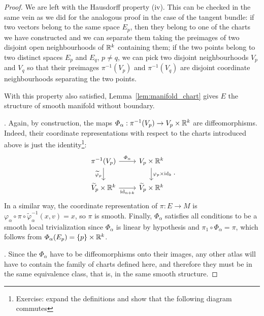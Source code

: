 \begin{proof}
	We are left with the Hausdorff property (iv).
	This can be checked in the same vein as we did for the analogous proof in the case of the tangent bundle:
	if two vectors belong to the same space $E_p$, then they belong to one of the charts we have constructed and we can separate them taking the preimages of two disjoint open neighbourhoods of $\mathbb{R}^k$ containing them; if the two points belong to two distinct spaces $E_p$ and $E_q$, $p\neq q$, we can pick two disjoint neighbourhoods $V_p$ and $V_q$ so that their preimages $\pi^{-1}(V_p)$ and $\pi^{-1}(V_q)$ are disjoint coordinate neighbourhoods separating the two points.

	With this property also satisfied, Lemma~\ref{lem:manifold_chart} gives $E$ the structure of smooth manifold without boundary.

	.
	Again, by construction, the maps $\varPhi_\alpha : \pi^{-1}(V_p) \to V_p\times\mathbb{R}^k$ are diffeomorphisms.
	Indeed, their coordinate representations with respect to the charts introduced above is just the identity\footnote{Exercise: expand the definitions and show that the following diagram commutes}:
	\begin{equation}
		\begin{tikzcd}
			{\pi^{-1}(V_p)} & {V_p\times\R^k} \\
			{\widetilde{V}_p\times\R^k} & {\widetilde{V}_p\times\R^k}
			\arrow["{\varPhi_\alpha}", from=1-1, to=1-2]
			\arrow["{\varphi_p\times\id_k}", from=1-2, to=2-2]
			\arrow["{\widetilde{\varphi}_p}"', from=1-1, to=2-1]
			\arrow["{\id_{n+k}}"', from=2-1, to=2-2]
		\end{tikzcd}.
	\end{equation}
	In a similar way, the coordinate representation of $\pi : E \to M$ is $\varphi_\alpha \circ \pi \circ \widetilde{\varphi}_\alpha^{-1} (x,v) = x$, so $\pi$ is smooth.
	Finally, $\Phi_\alpha$ satisfies all conditions to be a smooth local trivialization since $\varPhi_\alpha$ is linear by hypothesis and $\pi_1 \circ \varPhi_\alpha = \pi$, which follows from $\varPhi_\alpha(E_p) = \{p\}\times \mathbb{R}^k$.

	.
	Since the $\varPhi_\alpha$ have to be diffeomorphisms onto their images, any other atlas will have to contain the family of charts defined here, and therefore they must be in the same equivalence class, that is, in the same smooth structure.
\end{proof}

